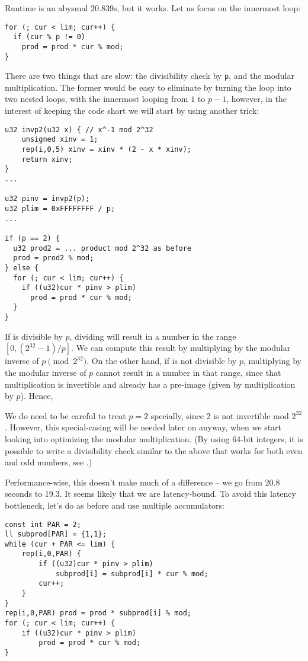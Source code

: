 Runtime is an abysmal 20.839s, but it works.
Let us focus on the innermost loop:
\begin{lstlisting}
for (; cur < lim; cur++) {
  if (cur % p != 0)
    prod = prod * cur % mod;
}
\end{lstlisting}

There are two things that are slow: the divisibility check by \texttt{p}, and the modular multiplication.
The former would be easy to eliminate by turning the loop into two nested loops, with the innermost looping from $1$ to $p-1$, however, in the interest of keeping the code short we will start by using another trick:

\begin{lstlisting}
u32 invp2(u32 x) { // x^-1 mod 2^32
	unsigned xinv = 1;
	rep(i,0,5) xinv = xinv * (2 - x * xinv);
	return xinv;
}
...

u32 pinv = invp2(p);
u32 plim = 0xFFFFFFFF / p;
...

if (p == 2) {
  u32 prod2 = ... product mod 2^32 as before
  prod = prod2 % mod;
} else {
  for (; cur < lim; cur++) {
    if ((u32)cur * pinv > plim)
      prod = prod * cur % mod;
  }
}
\end{lstlisting}

If \verb@cur@ is divisible by $p$, dividing will result in a number in the range $[0, (2^{32}-1) / p]$.
We can compute this result by multiplying by the modular inverse of $p \pmod{2^{32}}$.
On the other hand, if \verb@cur@ is not divisible by $p$, multiplying by the modular inverse of $p$ cannot result in a number in that range, since that multiplication is invertible and already has a pre-image (given by multiplication by $p$).
Hence, \verb@cur % p == 0@ can be replaced by \verb@(u32)cur * pinv <= plim@, multiplication being a much cheaper operation than modulo.

We do need to be careful to treat $p = 2$ specially, since 2 is not invertible mod $2^{32}$.
However, this special-casing will be needed later on anyway, when we start looking into optimizing the modular multiplication.
(By using 64-bit integers, it is possible to write a divisibility check similar to the above that works for both even and odd numbers, see \cite{fastdivcheck}.)

Performance-wise, this doesn't make much of a difference -- we go from 20.8 seconds to 19.3.
It seems likely that we are latency-bound.
To avoid this latency bottleneck, let's do as before and use multiple accumulators:

\begin{lstlisting}
const int PAR = 2;
ll subprod[PAR] = {1,1};
while (cur + PAR <= lim) {
	rep(i,0,PAR) {
		if ((u32)cur * pinv > plim)
			subprod[i] = subprod[i] * cur % mod;
		cur++;
	}
}
rep(i,0,PAR) prod = prod * subprod[i] % mod;
for (; cur < lim; cur++) {
	if ((u32)cur * pinv > plim)
		prod = prod * cur % mod;
}
\end{lstlisting}

